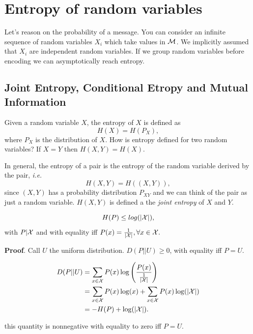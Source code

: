 \chapter{Entropy of random variables}

Let's reason on the probability of a message. You can consider an infinite sequence of random variables $X_i$ which take values in $\mathcal{M}$. We implicitly assumed that $X_i$ are independent random variables. If we group random variables before encoding we can asymptotically reach entropy.

\section{Joint Entropy, Conditional Etropy and Mutual Information}

Given a random variable $X$, the entropy of $X$ is defined as $$H(X) = H(P_X),$$ where $P_X$ is the distribution of $X$. How is entropy defined for two random variables? If $X=Y$ then $H(X, Y) = H(X).$

\begin{definition}
In general, the entropy of a pair is the entropy of the random variable derived by the pair, \emph{i.e.}
\begin{equation}
H(X, Y) = H((X, Y)), 
\end{equation}
since $(X, Y)$ has a probability distribution $P_{XY}$ and we can think of the pair as just a random variable. $H(X, Y)$ is defined a the \emph{joint entropy} of $X$ and $Y$. 
\end{definition}



\begin{prop}
 $$H(P) \leq log(|\mathcal{X}|),$$ with $P|\mathcal{X}$ and with equality iff $P(x) = \frac{1}{|\mathcal{X}|}, \forall x \in \mathcal{X}.$
\end{prop}
\noindent\textbf{Proof}. Call $U$ the uniform distribution. $D(P||U)\geq 0$, with equality iff $P = U$.

\begin{align*}
 D(P||U) & = \sum_{x \in \mathcal{X}} P(x)\log\left(\dfrac{P(x)}{\frac{1}{|\mathcal{X}|}}\right)\\
 & = \sum_{x \in \mathcal{X}} P(x)\log(x) + \sum_{x\in\mathcal{X}} P(x)\log(|\mathcal{X}|)\\
 & = -H(P) + \log(|\mathcal{X}|).
\end{align*}

this quantity is nonnegative with equality to zero iff $P=U.$\\

